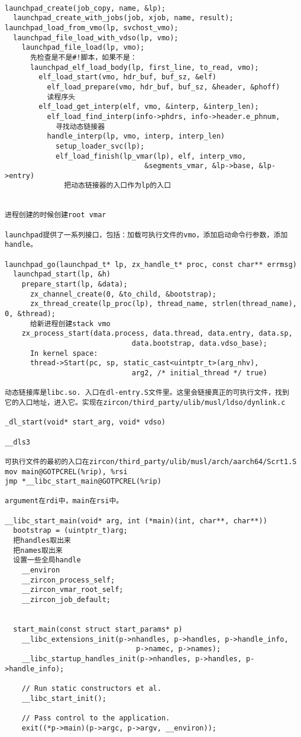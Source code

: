 \begin{verbatim}

launchpad_create(job_copy, name, &lp);
  launchpad_create_with_jobs(job, xjob, name, result);
launchpad_load_from_vmo(lp, svchost_vmo);
  launchpad_file_load_with_vdso(lp, vmo);
    launchpad_file_load(lp, vmo);
      先检查是不是#!脚本，如果不是：
      launchpad_elf_load_body(lp, first_line, to_read, vmo);
        elf_load_start(vmo, hdr_buf, buf_sz, &elf)
          elf_load_prepare(vmo, hdr_buf, buf_sz, &header, &phoff)
          读程序头
        elf_load_get_interp(elf, vmo, &interp, &interp_len);
          elf_load_find_interp(info->phdrs, info->header.e_phnum,
            寻找动态链接器
          handle_interp(lp, vmo, interp, interp_len)
            setup_loader_svc(lp);
            elf_load_finish(lp_vmar(lp), elf, interp_vmo,
                                 &segments_vmar, &lp->base, &lp->entry)
              把动态链接器的入口作为lp的入口


进程创建的时候创建root vmar

launchpad提供了一系列接口，包括：加载可执行文件的vmo，添加启动命令行参数，添加handle。

launchpad_go(launchpad_t* lp, zx_handle_t* proc, const char** errmsg)
  launchpad_start(lp, &h)
    prepare_start(lp, &data);
      zx_channel_create(0, &to_child, &bootstrap);
      zx_thread_create(lp_proc(lp), thread_name, strlen(thread_name), 0, &thread);
      给新进程创建stack vmo
    zx_process_start(data.process, data.thread, data.entry, data.sp,
                              data.bootstrap, data.vdso_base);
      In kernel space:
      thread->Start(pc, sp, static_cast<uintptr_t>(arg_nhv),
                              arg2, /* initial_thread */ true)              

动态链接库是libc.so. 入口在dl-entry.S文件里。这里会链接真正的可执行文件，找到
它的入口地址，进入它。实现在zircon/third_party/ulib/musl/ldso/dynlink.c

_dl_start(void* start_arg, void* vdso)

__dls3

可执行文件的最初的入口在zircon/third_party/ulib/musl/arch/aarch64/Scrt1.S
mov main@GOTPCREL(%rip), %rsi
jmp *__libc_start_main@GOTPCREL(%rip)

argument在rdi中，main在rsi中。

__libc_start_main(void* arg, int (*main)(int, char**, char**))
  bootstrap = (uintptr_t)arg;
  把handles取出来
  把names取出来
  设置一些全局handle
    __environ
    __zircon_process_self;
    __zircon_vmar_root_self;
    __zircon_job_default;


  start_main(const struct start_params* p)
    __libc_extensions_init(p->nhandles, p->handles, p->handle_info,
                               p->namec, p->names);
    __libc_startup_handles_init(p->nhandles, p->handles, p->handle_info);

    // Run static constructors et al.
    __libc_start_init();
                           
    // Pass control to the application.
    exit((*p->main)(p->argc, p->argv, __environ));  

\end{verbatim}